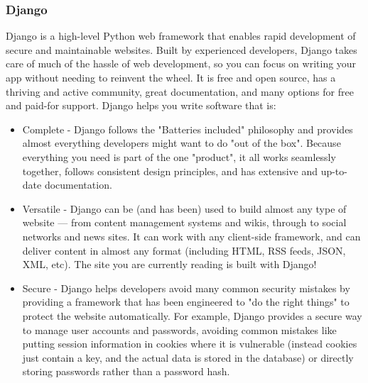 \subsubsection{Django}
Django is a high-level Python web framework that enables rapid development of secure and maintainable websites. Built by experienced developers, Django takes care of much of the hassle of web development, so you can focus on writing your app without needing to reinvent the wheel. It is free and open source, has a thriving and active community, great documentation, and many options for free and paid-for support. \newline Django helps you write software that is:
\begin{itemize}
\item Complete - Django follows the "Batteries included" philosophy and provides almost everything developers might want to do "out of the box". Because everything you need is part of the one "product", it all works seamlessly together, follows consistent design principles, and has extensive and up-to-date documentation.
\item Versatile - Django can be (and has been) used to build almost any type of website — from content management systems and wikis, through to social networks and news sites. It can work with any client-side framework, and can deliver content in almost any format (including HTML, RSS feeds, JSON, XML, etc). The site you are currently reading is built with Django!
\item Secure - Django helps developers avoid many common security mistakes by providing a framework that has been engineered to "do the right things" to protect the website automatically. For example, Django provides a secure way to manage user accounts and passwords, avoiding common mistakes like putting session information in cookies where it is vulnerable (instead cookies just contain a key, and the actual data is stored in the database) or directly storing passwords rather than a password hash.


\end{itemize}
